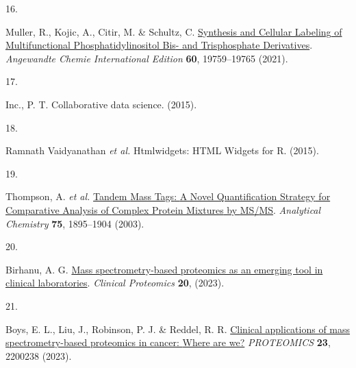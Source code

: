 \documentclass[
  letterpaper,
  DIV=11,
  numbers=noendperiod]{scrartcl}
\newlength{\cslhangindent}
\newlength{\csllabelwidth}
\newenvironment{CSLReferences}[2] %
 {\begin{list}{}{%
  \setlength{\itemindent}{0pt}
  \setlength{\leftmargin}{0pt}
  \setlength{\parsep}{0pt}
  \ifodd #1
   \setlength{\leftmargin}{\cslhangindent}
   \setlength{\itemindent}{-1\cslhangindent}
  \fi
  \setlength{\itemsep}{#2\baselineskip}}}
 {\end{list}}
\newcommand{\CSLLeftMargin}[1]{\parbox[t]{\csllabelwidth}{\strut#1\strut}}
\newcommand{\CSLRightInline}[1]{\parbox[t]{\linewidth - \csllabelwidth}{\strut#1\strut}}
\begin{document}
\begin{CSLReferences}{0}{0}
\CSLLeftMargin{16. }%
\CSLRightInline{Muller, R., Kojic, A., Citir, M. \& Schultz, C.
\href{https://doi.org/10.1002/anie.202103599}{Synthesis and {Cellular
Labeling} of {Multifunctional Phosphatidylinositol Bis}- and
{Trisphosphate Derivatives}}. \emph{Angewandte Chemie International
Edition} \textbf{60}, 19759--19765 (2021).}

\CSLLeftMargin{17. }%
\CSLRightInline{Inc., P. T. Collaborative data science. (2015).}

\CSLLeftMargin{18. }%
\CSLRightInline{Ramnath Vaidyanathan \emph{et al.} Htmlwidgets: {HTML
Widgets} for {R}. (2015).}

\CSLLeftMargin{19. }%
\CSLRightInline{Thompson, A. \emph{et al.}
\href{https://doi.org/10.1021/ac0262560}{Tandem {Mass Tags}: {A Novel
Quantification Strategy} for {Comparative Analysis} of {Complex Protein
Mixtures} by {MS}/{MS}}. \emph{Analytical Chemistry} \textbf{75},
1895--1904 (2003).}

\CSLLeftMargin{20. }%
\CSLRightInline{Birhanu, A. G.
\href{https://doi.org/10.1186/s12014-023-09424-x}{Mass
spectrometry-based proteomics as an emerging tool in clinical
laboratories}. \emph{Clinical Proteomics} \textbf{20}, (2023).}

\CSLLeftMargin{21. }%
\CSLRightInline{Boys, E. L., Liu, J., Robinson, P. J. \& Reddel, R. R.
\href{https://doi.org/10.1002/pmic.202200238}{Clinical applications of
mass spectrometry-based proteomics in cancer: {Where} are we?}
\emph{PROTEOMICS} \textbf{23}, 2200238 (2023).}

\end{CSLReferences}
\end{document}

